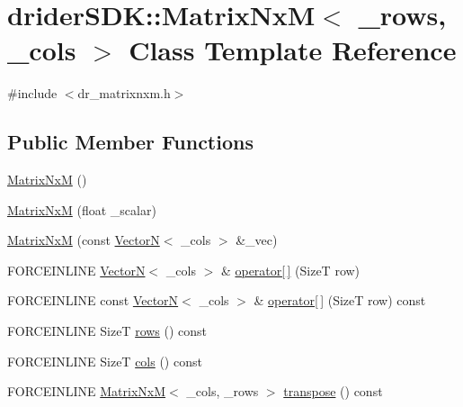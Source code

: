 \hypertarget{classdrider_s_d_k_1_1_matrix_nx_m}{}\section{drider\+S\+DK\+:\+:Matrix\+NxM$<$ \+\_\+rows, \+\_\+cols $>$ Class Template Reference}
\label{classdrider_s_d_k_1_1_matrix_nx_m}


{\ttfamily \#include $<$dr\+\_\+matrixnxm.\+h$>$}

\subsection*{Public Member Functions}
\begin{DoxyCompactItemize}
\item 
\hyperlink{classdrider_s_d_k_1_1_matrix_nx_m_a6bb4435526729aa0f3b5e3a62b1f8198}{Matrix\+NxM} ()
\item 
\hyperlink{classdrider_s_d_k_1_1_matrix_nx_m_a3fdd8f83b66b5fb42810b34307de082c}{Matrix\+NxM} (float \+\_\+scalar)
\item 
\hyperlink{classdrider_s_d_k_1_1_matrix_nx_m_adecea1304622d1824e5e8a02eaba9479}{Matrix\+NxM} (const \hyperlink{classdrider_s_d_k_1_1_vector_n}{VectorN}$<$ \+\_\+cols $>$ \&\+\_\+vec)
\item 
F\+O\+R\+C\+E\+I\+N\+L\+I\+NE \hyperlink{classdrider_s_d_k_1_1_vector_n}{VectorN}$<$ \+\_\+cols $>$ \& \hyperlink{classdrider_s_d_k_1_1_matrix_nx_m_a4aaf18e9a3b4a1dda70b55c791de7b88}{operator\mbox{[}$\,$\mbox{]}} (SizeT row)
\item 
F\+O\+R\+C\+E\+I\+N\+L\+I\+NE const \hyperlink{classdrider_s_d_k_1_1_vector_n}{VectorN}$<$ \+\_\+cols $>$ \& \hyperlink{classdrider_s_d_k_1_1_matrix_nx_m_a043966a6ae4d2bca20bdb7193cdc7364}{operator\mbox{[}$\,$\mbox{]}} (SizeT row) const
\item 
F\+O\+R\+C\+E\+I\+N\+L\+I\+NE SizeT \hyperlink{classdrider_s_d_k_1_1_matrix_nx_m_ae3f23c2fca691ab624f40759aced9fee}{rows} () const
\item 
F\+O\+R\+C\+E\+I\+N\+L\+I\+NE SizeT \hyperlink{classdrider_s_d_k_1_1_matrix_nx_m_a16d44a7c5d163643f24133ad5f32946d}{cols} () const
\item 
F\+O\+R\+C\+E\+I\+N\+L\+I\+NE \hyperlink{classdrider_s_d_k_1_1_matrix_nx_m}{Matrix\+NxM}$<$ \+\_\+cols, \+\_\+rows $>$ \hyperlink{classdrider_s_d_k_1_1_matrix_nx_m_a905c8727dad2b8dc8c0e90a87489dd9a}{transpose} () const
\item 

\end{DoxyCompactItemize}
